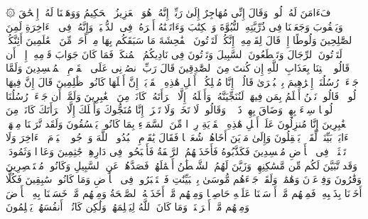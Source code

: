\startbuffer[\q:29:26]
۞ فَءَامَنَ لَهُۥ لُوطࣱۘ وَقَالَ إِنِّی مُهَاجِرٌ إِلَىٰ رَبِّیۤۖ إِنَّهُۥ هُوَ ٱلۡعَزِیزُ ٱلۡحَكِیمُ%
\stopbuffer
\startbuffer[\q:29:27]
وَوَهَبۡنَا لَهُۥۤ إِسۡحَٰقَ وَیَعۡقُوبَ وَجَعَلۡنَا فِی ذُرِّیَّتِهِ ٱلنُّبُوَّةَ وَٱلۡكِتَٰبَ وَءَاتَیۡنَٰهُ أَجۡرَهُۥ فِی ٱلدُّنۡیَاۖ وَإِنَّهُۥ فِی ٱلۡءَاخِرَةِ لَمِنَ ٱلصَّٰلِحِینَ%
\stopbuffer
\startbuffer[\q:29:28]
وَلُوطًا إِذۡ قَالَ لِقَوۡمِهِۦۤ إِنَّكُمۡ لَتَأۡتُونَ ٱلۡفَٰحِشَةَ مَا سَبَقَكُم بِهَا مِنۡ أَحَدࣲ مِّنَ ٱلۡعَٰلَمِینَ%
\stopbuffer
\startbuffer[\q:29:29]
أَئِنَّكُمۡ لَتَأۡتُونَ ٱلرِّجَالَ وَتَقۡطَعُونَ ٱلسَّبِیلَ وَتَأۡتُونَ فِی نَادِیكُمُ ٱلۡمُنكَرَۖ فَمَا كَانَ جَوَابَ قَوۡمِهِۦۤ إِلَّاۤ أَن قَالُوا۟ ٱئۡتِنَا بِعَذَابِ ٱللَّهِ إِن كُنتَ مِنَ ٱلصَّٰدِقِینَ%
\stopbuffer
\startbuffer[\q:29:30]
قَالَ رَبِّ ٱنصُرۡنِی عَلَى ٱلۡقَوۡمِ ٱلۡمُفۡسِدِینَ%
\stopbuffer
\startbuffer[\q:29:31]
وَلَمَّا جَاۤءَتۡ رُسُلُنَاۤ إِبۡرَٰهِیمَ بِٱلۡبُشۡرَىٰ قَالُوۤا۟ إِنَّا مُهۡلِكُوۤا۟ أَهۡلِ هَٰذِهِ ٱلۡقَرۡیَةِۖ إِنَّ أَهۡلَهَا كَانُوا۟ ظَٰلِمِینَ%
\stopbuffer
\startbuffer[\q:29:32]
قَالَ إِنَّ فِیهَا لُوطࣰاۚ قَالُوا۟ نَحۡنُ أَعۡلَمُ بِمَن فِیهَاۖ لَنُنَجِّیَنَّهُۥ وَأَهۡلَهُۥۤ إِلَّا ٱمۡرَأَتَهُۥ كَانَتۡ مِنَ ٱلۡغَٰبِرِینَ%
\stopbuffer
\startbuffer[\q:29:33]
وَلَمَّاۤ أَن جَاۤءَتۡ رُسُلُنَا لُوطࣰا سِیۤءَ بِهِمۡ وَضَاقَ بِهِمۡ ذَرۡعࣰاۖ وَقَالُوا۟ لَا تَخَفۡ وَلَا تَحۡزَنۡ إِنَّا مُنَجُّوكَ وَأَهۡلَكَ إِلَّا ٱمۡرَأَتَكَ كَانَتۡ مِنَ ٱلۡغَٰبِرِینَ%
\stopbuffer
\startbuffer[\q:29:34]
إِنَّا مُنزِلُونَ عَلَىٰۤ أَهۡلِ هَٰذِهِ ٱلۡقَرۡیَةِ رِجۡزࣰا مِّنَ ٱلسَّمَاۤءِ بِمَا كَانُوا۟ یَفۡسُقُونَ%
\stopbuffer
\startbuffer[\q:29:35]
وَلَقَد تَّرَكۡنَا مِنۡهَاۤ ءَایَةَۢ بَیِّنَةࣰ لِّقَوۡمࣲ یَعۡقِلُونَ%
\stopbuffer
\startbuffer[\q:29:36]
وَإِلَىٰ مَدۡیَنَ أَخَاهُمۡ شُعَیۡبࣰا فَقَالَ یَٰقَوۡمِ ٱعۡبُدُوا۟ ٱللَّهَ وَٱرۡجُوا۟ ٱلۡیَوۡمَ ٱلۡءَاخِرَ وَلَا تَعۡثَوۡا۟ فِی ٱلۡأَرۡضِ مُفۡسِدِینَ%
\stopbuffer
\startbuffer[\q:29:37]
فَكَذَّبُوهُ فَأَخَذَتۡهُمُ ٱلرَّجۡفَةُ فَأَصۡبَحُوا۟ فِی دَارِهِمۡ جَٰثِمِینَ%
\stopbuffer
\startbuffer[\q:29:38]
وَعَادࣰا وَثَمُودَا۟ وَقَد تَّبَیَّنَ لَكُم مِّن مَّسَٰكِنِهِمۡۖ وَزَیَّنَ لَهُمُ ٱلشَّیۡطَٰنُ أَعۡمَٰلَهُمۡ فَصَدَّهُمۡ عَنِ ٱلسَّبِیلِ وَكَانُوا۟ مُسۡتَبۡصِرِینَ%
\stopbuffer
\startbuffer[\q:29:39]
وَقَٰرُونَ وَفِرۡعَوۡنَ وَهَٰمَٰنَۖ وَلَقَدۡ جَاۤءَهُم مُّوسَىٰ بِٱلۡبَیِّنَٰتِ فَٱسۡتَكۡبَرُوا۟ فِی ٱلۡأَرۡضِ وَمَا كَانُوا۟ سَٰبِقِینَ%
\stopbuffer
\startbuffer[\q:29:40]
فَكُلًّا أَخَذۡنَا بِذَنۢبِهِۦۖ فَمِنۡهُم مَّنۡ أَرۡسَلۡنَا عَلَیۡهِ حَاصِبࣰا وَمِنۡهُم مَّنۡ أَخَذَتۡهُ ٱلصَّیۡحَةُ وَمِنۡهُم مَّنۡ خَسَفۡنَا بِهِ ٱلۡأَرۡضَ وَمِنۡهُم مَّنۡ أَغۡرَقۡنَاۚ وَمَا كَانَ ٱللَّهُ لِیَظۡلِمَهُمۡ وَلَٰكِن كَانُوۤا۟ أَنفُسَهُمۡ یَظۡلِمُونَ%
